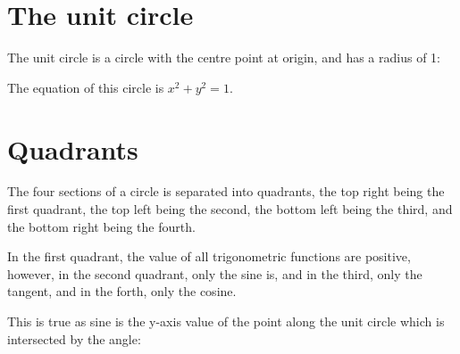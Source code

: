 \documentclass{book}
\begin{document}
\section{The unit circle}
The unit circle is a circle with the centre point at origin, and has a radius of 1:
\begin{center}
\end{center}
The equation of this circle is $x^2 + y^2 = 1$.

\section{Quadrants}
The four sections of a circle is separated into quadrants, the top right being the first quadrant, the top left being the second, the bottom left being the third, and the bottom right being the fourth.
\begin{center}
\end{center}
In the first quadrant, the value of all trigonometric functions are positive, however, in the second quadrant, only the sine is, and in the third, only the tangent, and in the forth, only the cosine.
\begin{center}
\end{center}
This is true as sine is the y-axis value of the point along the unit circle which is intersected by the angle:
\begin{center}
\end{center}
\end{document}
